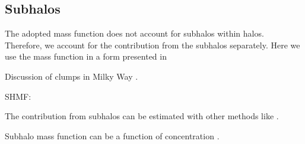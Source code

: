 \subsection{Subhalos}

The adopted mass function does not account for subhalos within halos. Therefore, we account for the contribution from the subhalos separately. Here we use the mass function in a form presented in \cite{Sanchez_Conde_2014} 

Discussion of clumps in Milky Way \cite{Belotsky_2014}.

SHMF:
\cite{Bosch_2014}
\cite{Cautun_2014}

The contribution from subhalos can be estimated with other methods like \cite{2015arXiv150802713Z}.

Subhalo mass function can be a function of concentration \cite{Mao_2015, Emberson_2015}.